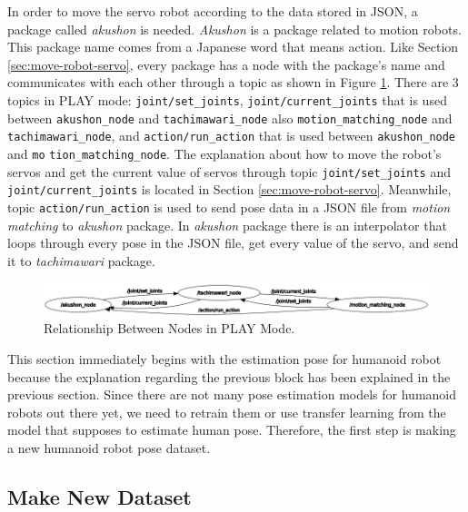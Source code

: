 In order to move the servo robot according to the data stored in JSON, a package called \emph{akushon} is needed. \emph{Akushon} is a package related to motion robots. This package name comes from a Japanese word that means action.
Like Section \ref{sec:move-robot-servo}, every package has a node with the package's name and communicates with each other through a topic as shown in Figure \ref{fig:relation-node-play-mode}. There are 3 topics in PLAY mode: \verb|joint/set_joints|, \verb|joint/current_joints| that is used between \verb|akushon_node| and \verb|tachimawari_node| also \verb|motion_matching_node| and \verb|tachimawari_node|,
and \verb|action/run_action| that is used between \verb|akushon_node| and \verb|mo| \verb|tion_matching_node|.
The explanation about how to move the robot's servos and get the current value of servos through topic \verb|joint/set_joints| and \verb|joint/current_joints| is located in Section \ref{sec:move-robot-servo}.
Meanwhile, topic \verb|action/run_action| is used to send pose data in a JSON file from \emph{motion matching} to \emph{akushon} package. In \emph{akushon} package there is an interpolator that loops through every pose in the JSON file, get every value of the servo, and send it to \emph{tachimawari} package.
\begin{figure}[ht]
  \centering
  \includegraphics[scale=0.64]{gambar/rqt_akushon.png}
  \caption{Relationship Between Nodes in PLAY Mode.}
  \label{fig:relation-node-play-mode}
\end{figure}

This section immediately begins with the estimation pose for humanoid robot because the explanation regarding the previous block has been explained in the previous section.
Since there are not many pose estimation models for humanoid robots out there yet, we need to retrain them or use transfer learning from the model that supposes to estimate human pose.
Therefore, the first step is making a new humanoid robot pose dataset.

\subsection{Make New Dataset}
\label{subsec:make-new-dataset}

